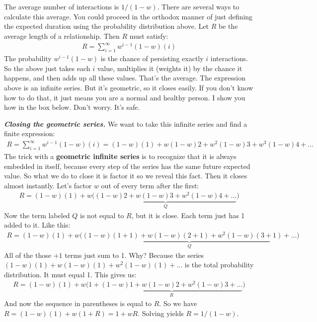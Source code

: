 \documentclass[10pt,reqno]{amsbook}
\newcommand{\bemph}[1]{{\textbf{\textcolor{bemphcol}{#1}}}}
\numberwithin{equation}{chapter}
\newenvironment{mathbox}[2]
{\begin{table}[#1]
\justify\begin{tcolorbox}[enhanced, oversize]\footnotesize\noindent\textbf{\emph{#2}}}
{\end{tcolorbox}\end{table}}
\begin{document}
The average number of interactions is $1/(1-w)$. There are several ways to calculate this average. You could proceed in the orthodox manner of just defining the expected duration using the probability distribution above. Let $R$ be the average length of a relationship. Then $R$ must satisfy:
\begin{align*}
	R = \sum_{i=1}^{\infty} w^{i-1}(1-w)(i)
\end{align*}
The probability $w^{i-1}(1-w)$ is the chance of persisting exactly $i$ interactions. So the above just takes each $i$ value, multiplies it (weights it) by the chance it happens, and then adds up all these values. That's the average. The expression above is an infinite series. But it's geometric, so it closes easily. If you don't know how to do that, it just means you are a normal and healthy person. I show you how in the box below. Don't worry. It's safe.

\begin{mathbox}{b}{Closing the geometric series.}
We want to take this infinite series and find a finite expression:
\begin{align*}
	R = \sum_{i=1}^{\infty} w^{i-1}(1-w)(i) = (1-w)(1) + w(1-w)2 + w^2(1-w)3 + w^3(1-w)4 + ... 
\end{align*}
The trick with a \bemph{geometric infinite series} is to recognize that it is always embedded in itself, because every step of the series has the same future expected value. So what we do to close it is factor it so we reveal this fact. Then it closes almost instantly. Let's factor $w$ out of every term after the first:
\begin{align*}
	R = (1-w)(1) + w\big( \underbrace{ (1-w)2 + w(1-w)3 + w^2(1-w)4 + ... }_Q \big) 
\end{align*}
Now the term labeled $Q$ is not equal to $R$, but it is close. Each term just has 1 added to it. Like this:
\begin{align*}
	R = (1-w)(1) + w\big( \underbrace{ (1-w)(1+1) + w(1-w)(2+1) + w^2(1-w)(3+1) + ... }_Q \big) 
\end{align*}
All of the those $+1$ terms just sum to 1. Why? Because the series $(1-w)(1) + w(1-w)(1) + w^2(1-w)(1) + ...$ is the total probability distribution. It must equal 1. This gives us:
\begin{align*}
	R = (1-w)(1) + w\big( 1 + \underbrace{ (1-w)1 + w(1-w)2 + w^2(1-w)3 + ... }_R \big) 
\end{align*}
And now the sequence in parentheses is equal to $R$. So we have $R = (1-w)(1) + w ( 1 + R ) = 1 + wR$. Solving yields $R=1/(1-w)$.

\end{mathbox}
\end{document}
